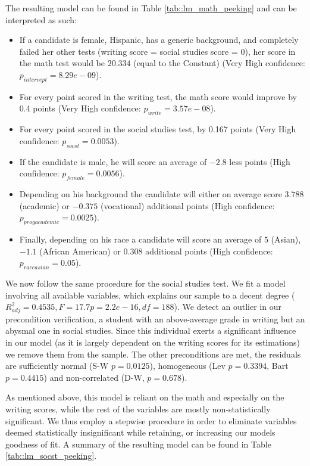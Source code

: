 \documentclass[10pt, a4paper]{article}
\begin{document}
	
	
	The resulting model can be found in Table \ref{tab::lm_math_peeking} and can be interpreted as such: 
	\begin{itemize}
		\item If a candidate is female, Hispanic, has a generic background, and completely failed her other tests (writing score = social studies score = 0), her score in the math test would be $20.334$ (equal to the Constant) (Very High confidence: $p_{intercept} = 8.29e-09$). 
		\item For every point scored in the writing test, the math score would improve by 0.4 points (Very High confidence: $p_{write} = 3.57e-08$).
		\item For every point scored in the social studies test, by 0.167 points (Very High confidence: $p_{socst} = 0.0053$).
		\item If the candidate is male, he will score an average of $-2.8$ less points (High confidence: $p_{female} = 0.0056$).
		\item Depending on his background the candidate will either on average score $3.788$ (academic) or $-0.375$ (vocational) additional points (High confidence: $p_{progacademic} = 0.0025$).
		\item Finally, depending on his race a candidate will score an average of $5$ (Asian), $-1.1$ (African American) or $0.308$ additional points (High confidence: $p_{raceasian} = 0.05$).
	\end{itemize}

	We now follow the same procedure for the social studies test. We fit a model involving all available variables, which explains our sample to a decent degree ($R^2_{adj} = 0.4535, F= 17.7 p=2.2e-16, df=188$). We detect an outlier in our precondition verification, a student with an above-average grade in writing but an abysmal one in social studies. Since this individual exerts a significant influence in our model (as it is largely dependent on the writing scores for its estimations) we remove them from the sample. The other preconditions are met, the residuals are sufficiently normal (S-W $p = 0.0125$), homogeneous (Lev $p = 0.3394$, Bart $p = 0.4415$) and non-correlated (D-W, $p=0.678$).
	
	As mentioned above, this model is reliant on the math and especially on the writing scores, while the rest of the variables are mostly non-statistically significant. We thus employ a stepwise procedure in order to eliminate variables deemed statistically insignificant while retaining, or increasing our models goodness of fit. A summary of the resulting model can be found in Table \ref{tab::lm_socst_peeking}.
	
\end{document}
